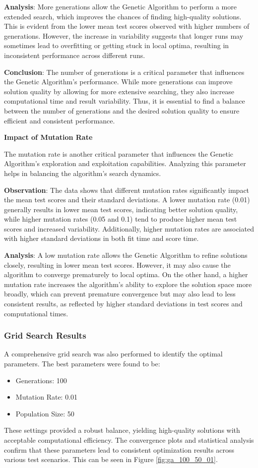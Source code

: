 \documentclass{article}
\begin{document}
    \textbf{Analysis}: More generations allow the Genetic Algorithm to perform a more extended search, which improves the chances of finding high-quality solutions. This is evident from the lower mean test scores observed with higher numbers of generations. However, the increase in variability suggests that longer runs may sometimes lead to overfitting or getting stuck in local optima, resulting in inconsistent performance across different runs.

    \textbf{Conclusion}: The number of generations is a critical parameter that influences the Genetic Algorithm's performance. While more generations can improve solution quality by allowing for more extensive searching, they also increase computational time and result variability. Thus, it is essential to find a balance between the number of generations and the desired solution quality to ensure efficient and consistent performance.

    \textbf{Impact of Mutation Rate}

    The mutation rate is another critical parameter that influences the Genetic Algorithm’s exploration and exploitation capabilities. Analyzing this parameter helps in balancing the algorithm’s search dynamics.

    \textbf{Observation}: The data shows that different mutation rates significantly impact the mean test scores and their standard deviations. A lower mutation rate (0.01) generally results in lower mean test scores, indicating better solution quality, while higher mutation rates (0.05 and 0.1) tend to produce higher mean test scores and increased variability. Additionally, higher mutation rates are associated with higher standard deviations in both fit time and score time.

    \textbf{Analysis}: A low mutation rate allows the Genetic Algorithm to refine solutions closely, resulting in lower mean test scores. However, it may also cause the algorithm to converge prematurely to local optima. On the other hand, a higher mutation rate increases the algorithm's ability to explore the solution space more broadly, which can prevent premature convergence but may also lead to less consistent results, as reflected by higher standard deviations in test scores and computational times.

    \subsubsection{Grid Search Results}
    A comprehensive grid search was also performed to identify the optimal parameters. The best parameters were found to be:
    \begin{itemize}
        \item Generations: 100
        \item Mutation Rate: 0.01
        \item Population Size: 50
    \end{itemize}
    These settings provided a robust balance, yielding high-quality solutions with acceptable computational efficiency. The convergence plots and statistical analysis confirm that these parameters lead to consistent optimization results across various test scenarios. This can be seen in Figure \ref{fig:ga_100_50_01}.
\end{document}
